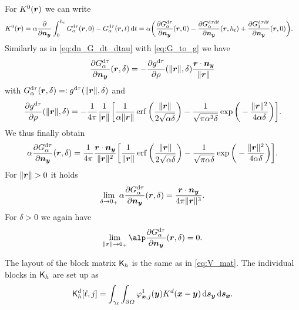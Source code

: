 \documentclass[a4paper,11pt]{article}
\begin{document}
For $K^0({{\bm{r}}})$ we can write
\begin{align*}
  K^0({{\bm{r}}}) &= \alpha\frac{\partial}{\partial {\ensuremath{{\bm{n}}}}_{{\bm{y}}}} \int_{0}^{h_t} G^{{\mathrm{d}} \tau}_\alpha({{\bm{r}}},0) - G^{{\mathrm{d}} \tau}_\alpha({{\bm{r}}}, t) \,{\mathrm{d}} t 
  = \alpha \bigg( \frac{\partial G^{{\mathrm{d}}\tau}_\alpha}{\partial {\ensuremath{{\bm{n}}}}_{{\bm{y}}}} ({{\bm{r}}},0) - \frac{\partial G^{{\mathrm{d}}\tau{\mathrm{d}} t}_\alpha}{\partial {\ensuremath{{\bm{n}}}}_{{\bm{y}}}}({{\bm{r}}},h_t) + \frac{\partial G^{{\mathrm{d}}\tau{\mathrm{d}} t}_1}{\partial {\ensuremath{{\bm{n}}}}_{{\bm{y}}}}({{\bm{r}}},0) \bigg).
\end{align*}
Similarly as in \eqref{eq:dn_G_dt_dtau} with \eqref{eq:G_to_g} we have
\begin{equation*}
  \frac{\partial G^{{\mathrm{d}}\tau}_\alpha}{\partial {\ensuremath{{\bm{n}}}}_{{\bm{y}}}}({{\bm{r}}},\delta) = -\frac{\partial g^{{\mathrm{d}}\tau}}{\partial \rho}(\|{{\bm{r}}}\|,\delta) \frac{{{\bm{r}}} \cdot {\ensuremath{{\bm{n}}}}_{{\bm{y}}}}{\|{{\bm{r}}}\|}
\end{equation*}
with $G^{{\mathrm{d}}\tau}_\alpha({{\bm{r}}},\delta) =: g^{{\mathrm{d}}\tau}(\|{{\bm{r}}}\|,\delta)$ and 
\begin{equation*}
  \frac{\partial g^{{\mathrm{d}}\tau}}{\partial \rho}(\|{{\bm{r}}}\|,\delta) = -\frac{1}{4\pi} \frac{1}{|{{\bm{r}}}\|}\bigg[ \frac{1}{\alpha\|{{\bm{r}}}\|} \operatorname{erf}\bigg( \frac{\|{{\bm{r}}}\|}{2\sqrt{\alpha\delta}} \bigg) - \frac{1}{\sqrt{\pi\alpha^3\delta}} \exp\bigg( -\frac{\|{{\bm{r}}}\|^2}{4\alpha\delta} \bigg) \bigg].
\end{equation*}
We thus finally obtain
\begin{equation}
\label{eq:dn_G_dtau}
  \alpha \frac{\partial G^{{\mathrm{d}}\tau}_\alpha}{\partial {\ensuremath{{\bm{n}}}}_{{\bm{y}}}}({{\bm{r}}},\delta) = \frac{1}{4\pi} \frac{{{\bm{r}}} \cdot {\ensuremath{{\bm{n}}}}_{{\bm{y}}}}{\|{{\bm{r}}}\|^2}\bigg[ \frac{1}{\|{{\bm{r}}}\|} \operatorname{erf}\bigg( \frac{\|{{\bm{r}}}\|}{2\sqrt{\alpha\delta}} \bigg) - \frac{1}{\sqrt{\pi\alpha\delta}} \exp\bigg( -\frac{\|{{\bm{r}}}\|^2}{4\alpha\delta} \bigg) \bigg].
\end{equation}
For $\|{{\bm{r}}}\| > 0$ it holds
\begin{equation}
\label{eq:dn_G_dtau_lim_r}
  \lim_{\delta \to 0_+} \alpha\frac{\partial G^{{\mathrm{d}}\tau}_\alpha}{\partial {\ensuremath{{\bm{n}}}}_{{\bm{y}}}}({{\bm{r}}},\delta) = \frac{ {{\bm{r}}} \cdot {\ensuremath{{\bm{n}}}}_{{\bm{y}}}}{4\pi\|{{\bm{r}}}\|^3}.
\end{equation}
For $\delta > 0$ we again have
\begin{equation*}
  \lim_{\|\vr\| \to 0_+}\alp \frac{\partial G^{\dif\tau}_\alpha}{\partial \vn_\vy}(\vr,\delta) = 0.
\end{equation*}

The layout of the block matrix ${{\mathsf{K}}}_h$ is the same as in \eqref{eq:V_mat}. The individual blocks in ${{\mathsf{K}}}_h$ are set up as
\begin{equation*}
  {\ensuremath{{\mathsf{K}}}}^d_h[ \ell , j ] = \int_{\gamma_\ell} \int_{\partial\Omega} \varphi^1_{{{\bm{x}}},j}({{\bm{y}}}) K^d({{\bm{x}}}-{{\bm{y}}}) \,{\mathrm{d}}{{\bm{s}}}_{{\bm{y}}} \,{\mathrm{d}}{{\bm{s}}}_{{\bm{x}}}.
\end{equation*}
\end{document}
